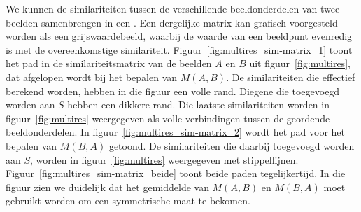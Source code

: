 
We kunnen de similariteiten tussen de verschillende beeldonderdelen van twee beelden
samenbrengen in een . Een dergelijke matrix kan grafisch 
voorgesteld worden als een grijswaardebeeld, waarbij de waarde van een beeldpunt evenredig is met
de overeenkomstige similariteit. Figuur~\ref{fig:multires_sim-matrix_1} toont het pad in de 
similariteitsmatrix van de beelden $A$ en $B$ uit figuur~\ref{fig:multires}, dat afgelopen wordt
bij het bepalen van $M(A,B)$.
De similariteiten die effectief berekend worden, hebben in die figuur een volle rand. Diegene 
die toegevoegd worden aan $S$ hebben een dikkere rand. Die laatste similariteiten 
worden in figuur~\ref{fig:multires} weergegeven als volle verbindingen tussen de
geordende beeldonderdelen. In figuur~\ref{fig:multires_sim-matrix_2} wordt het
pad voor het bepalen van $M(B,A)$ getoond. De similariteiten die daarbij toegevoegd 
worden aan $S$, worden in figuur~\ref{fig:multires} weergegeven met stippellijnen.
Figuur~\ref{fig:multires_sim-matrix_beide} toont beide paden tegelijkertijd. In die 
figuur zien we duidelijk dat het gemiddelde van $M(A,B)$ en $M(B,A)$ moet gebruikt 
worden om een symmetrische maat te bekomen.



